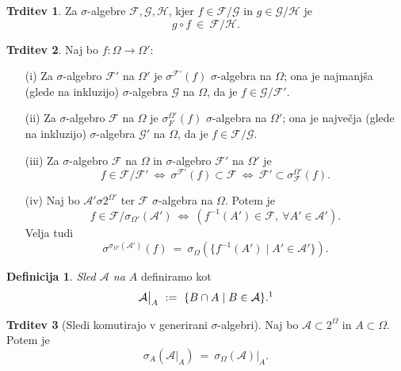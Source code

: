 \documentclass[11pt]{article}
\newcommand{\A}{\mathcal{A}}
\newcommand{\F}{\mathcal{F}}
\newcommand{\G}{\mathcal{G}}
\renewcommand{\H}{\mathcal{H}}
\newcommand{\set}[1]{\{#1\}}
\newcommand{\1}{\mathbbm{1}}
\theoremstyle{definition}
\newtheorem{definicija}{Definicija}[section]
\theoremstyle{definition}
\newtheorem{trditev}{Trditev}[section]
\theoremstyle{definition}
\theoremstyle{definition}
\begin{document}
\begin{trditev}

Za $\sigma$-algebre $\F,\G,\H$, kjer $f \in \F/\G$ in $g \in \G/\H$ je
$$g \circ f ~\in~ \F/\H.$$

\end{trditev}
\vspace{0.5cm}

\begin{trditev}

Naj bo $f: \Omega \rightarrow \Omega'$:
\begin{enumerate}

\item[(i)] Za $\sigma$-algebro $\F'$ na $\Omega'$ je $\sigma^{\F'}(f)$ $\sigma$-algebra na $\Omega$; ona je najmanjša (glede na inkluzijo) $\sigma$-algebra $\G$ na $\Omega$, da je $f \in \G/\F'$.

\item[(ii)] Za $\sigma$-algebro $\F$ na $\Omega$ je $\sigma_F^{\Omega'}(f)$ $\sigma$-algebra na $\Omega'$; ona je največja (glede na inkluzijo) $\sigma$-algebra $\G'$ na $\Omega$, da je $f \in \F/\G$.

\item[(iii)] Za $\sigma$-algebro $\F$ na $\Omega$ in $\sigma$-algebro $\F'$ na $\Omega'$ je
$$f \in \F/\F' ~\iff~ \sigma^{\F'}(f) \subset \F ~\iff~ \F' \subset \sigma_\F^{\Omega'}(f).$$

\item[(iv)] Naj bo $\A' \sigma 2^{\Omega'}$ ter $\F$ $\sigma$-algebra na $\Omega$. Potem je
$$f \in \F/\sigma_{\Omega'}(\A') ~\iff~ (f^{-1}(A') \in \F, ~\forall A' \in \A').$$
Velja tudi 
$$\sigma^{\sigma_{\Omega'}(\A')}(f) ~=~ \sigma_\Omega(\set{f^{-1}(A') \mid A' \in \A'}).$$

\end{enumerate}

\end{trditev}
\vspace{0.5cm}

\begin{definicija}

\textit{Sled $\A$ na $A$} definiramo kot
$$\A \big|_A ~:=~ \set{B \cap A \mid B \in \A}.\footnote{\text{Zapis je isti kot za zožitev, vendar ne pomeni isto.}}$$

\end{definicija}
\vspace{0.5cm}

\begin{trditev}[Sledi komutirajo v generirani $\sigma$-algebri]

Naj bo $\A \subset 2^\Omega$ in $A \subset \Omega$. Potem je
$$\sigma_A(\A \big|_A) ~=~ \sigma_\Omega(\A) \big|_A.$$

\end{trditev}
\vspace{0.5cm}


\pagebreak

\end{document}
